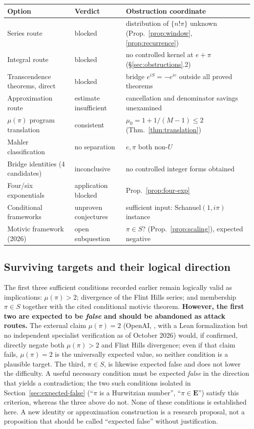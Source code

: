 \documentclass[11pt]{amsart}
\theoremstyle{definition}
\theoremstyle{remark}
\numberwithin{equation}{section}
\newcommand{\irr}{\mu}
\newcommand{\ee}{e}
\begin{document}
\begin{center}
\small\begin{tabularx}{\textwidth}{@{}p{}p{}X@{}}
\toprule
Option & Verdict & Obstruction coordinate \\
\midrule
Series route & blocked & distribution of $\{n!\pi\}$ unknown (Prop.~\ref{prop:window}, \ref{prop:recurrence}) \\
Integral route & blocked & no controlled kernel at $e+\pi$ (\S\ref{sec:obstructions}.2) \\
Transcendence theorems, direct & blocked & bridge $\ee^{iS}=-\ee^{ie}$ outside all proved theorems \\
Approximation route & estimate insufficient & cancellation and denominator savings unexamined \\
$\irr(\pi)$ program translation & consistent & $\irr_0=1+1/(M-1)\le2$ (Thm.~\ref{thm:translation}) \\
Mahler classification & no separation & $\ee,\pi$ both non-$U$ \\
Bridge identities (4 candidates) & inconclusive & no controlled integer forms obtained \\
Four/six exponentials & application blocked & Prop.~\ref{prop:four-exp} \\
Conditional frameworks & unproven conjectures & sufficient input: Schanuel$(1,i\pi)$ instance \\
Motivic framework (2026) & open subquestion & $\pi\in S$? (Prop.~\ref{prop:scaling}), expected negative \\
\bottomrule
\end{tabularx}
\end{center}

\subsection{Surviving targets and their logical direction}

The first three sufficient conditions recorded earlier remain logically valid as implications: $\irr(\pi)>2$; divergence of the Flint Hills series; and membership $\pi\in S$ together with the cited conditional motivic theorem. \textbf{However, the first two are expected to be \emph{false} and should be abandoned as attack routes.} The external claim $\irr(\pi)=2$ (OpenAI, \cite{OpenAI2026}, with a Lean formalization but no independent specialist verification as of October 2026) would, if confirmed, directly negate both $\irr(\pi)>2$ and Flint Hills divergence; even if that claim fails, $\irr(\pi)=2$ is the universally expected value, so neither condition is a plausible target. The third, $\pi\in S$, is likewise expected false and does not lower the difficulty. A useful necessary condition must be expected \emph{false} in the direction that yields a contradiction; the two such conditions isolated in Section~\ref{sec:expected-false} (``$\pi$ is a Hurwitzian number'', ``$\pi\in\mathbf{E}$'') satisfy this criterion, whereas the three above do not. None of these conditions is established here. A new identity or approximation construction is a research proposal, not a proposition that should be called ``expected false'' without justification.
\end{document}
